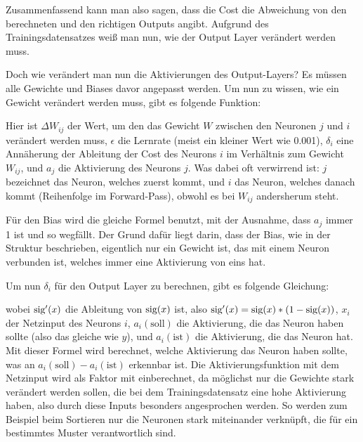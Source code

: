 \documentclass[11pt]{scrartcl}
\begin{document}
	Zusammenfassend kann man also sagen, dass die Cost die Abweichung von den berechneten und den richtigen Outputs angibt. Aufgrund des Trainingsdatensatzes weiß man nun, wie der Output Layer verändert werden
	muss.


	Doch wie verändert man nun die Aktivierungen des Output-Layers? Es müssen alle Gewichte und Biases davor angepasst werden. Um nun zu wissen, wie ein Gewicht verändert werden muss, gibt es folgende Funktion:

	\form{\[
		\Delta W_{ij} = \epsilon * \delta_i * a_j
	\]}
%
Hier ist  $\Delta W_{ij}$ der Wert, um den das Gewicht $W$ zwischen den Neuronen $j$ und $i$ verändert werden muss, $\epsilon$ die Lernrate (meist ein kleiner Wert wie 0.001), $\delta_i$ eine Annäherung der Ableitung der Cost des Neurons $i$ im Verhältnis zum Gewicht $W_{ij}$, und $a_j$ die Aktivierung des Neurons $j$. Was dabei oft verwirrend ist: $j$ bezeichnet das Neuron, welches zuerst kommt, und $i$ das Neuron, welches danach kommt (Reihenfolge im Forward-Pass), obwohl es bei $W_{ij}$ andersherum steht.

	Für den Bias wird die gleiche Formel benutzt, mit der Ausnahme, dass $a_j$ immer 1 ist und so wegfällt. Der Grund dafür liegt darin, dass der Bias, wie in der Struktur beschrieben, eigentlich nur ein Gewicht ist, das mit einem Neuron verbunden ist, welches immer eine Aktivierung von eins hat.

	Um nun $\delta_i$ für den Output Layer zu berechnen, gibt es folgende Gleichung: 

	\form{\[
		\delta_i = \sig '\left(x_i\right) * (a_i (\textrm{soll}) - a_i (\textrm{ist})) 
	\]}
%
	wobei $\textrm{sig} '(x)$ die Ableitung von $\textrm{sig}(x)$ ist, also $\textrm{sig}'(x) = \textrm{sig}(x) * (1 - \textrm{sig}(x))$, $x_i$ der Netzinput des Neurons $i$, $a_i(\textrm{soll})$ die Aktivierung, die das Neuron haben sollte (also das gleiche wie $y$), und $a_i(\textrm{ist})$ die Aktivierung, die das Neuron hat.
%
	Mit dieser Formel wird berechnet, welche Aktivierung das Neuron haben sollte, was an $a_i(\textrm{soll}) - a_i(\textrm{ist})$ erkennbar ist. Die Aktivierungsfunktion mit dem Netzinput wird als Faktor mit einberechnet, da möglichst nur die Gewichte stark verändert werden sollen, die bei dem Trainingsdatensatz eine hohe Aktivierung haben, also durch diese Inputs besonders angesprochen werden. So werden zum Beispiel beim Sortieren nur die Neuronen stark miteinander verknüpft, die für ein bestimmtes Muster verantwortlich sind.
	
\end{document}
